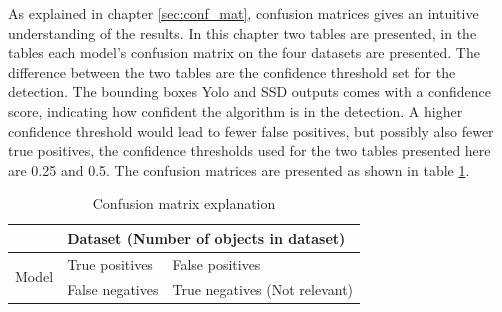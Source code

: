 As explained in chapter \ref{sec:conf_mat}, confusion matrices gives an intuitive understanding of the results. In this chapter two tables are presented, in the tables each model's confusion matrix on the four datasets are presented. The difference between the two tables are the confidence threshold set for the detection. The bounding boxes Yolo and SSD outputs comes with a confidence score, indicating how confident the algorithm is in the detection. A higher confidence threshold would lead to fewer false positives, but possibly also fewer true positives, the confidence thresholds used for the two tables presented here are 0.25 and 0.5. The confusion matrices are presented as shown in table \ref{tab:conf_exp}.



\begin{table}[h!]
\centering
\begin{tabular}{c|ll}
\multicolumn{1}{l|}{}  & \multicolumn{2}{l}{Dataset (Number of objects in dataset)} \\ \hline
\multirow{2}{*}{Model} & True positives        & False positives                    \\
                       & False negatives       & True negatives (Not relevant)     
\end{tabular}
\caption{Confusion matrix explanation}
\label{tab:conf_exp}
\end{table}

